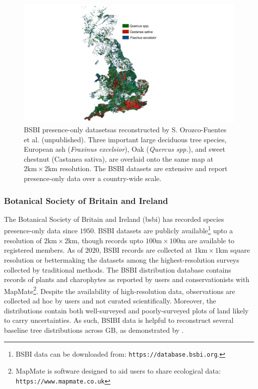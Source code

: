 \begin{figure}
    \centering
    \includegraphics[scale=0.25]{chapter2/figures/bsbi-data.pdf}
    \caption{BSBI presence-only datasets\textemdash as reconstructed by S. Orozco-Fuentes et al. (unpublished).
    Three important large deciduous tree species, European ash (\textit{Fraxinus excelsior}), 
    Oak (\textit{Quercus spp.}), and sweet chestnut (Castanea sativa), are overlaid onto the same map at $\mathrm{2km \times 2km}$ resolution.
    The BSBI datasets are extensive and report presence-only data over a country-wide scale.
    }
    \label{fig:bsbi-data}
\end{figure}

\subsubsection{Botanical Society of Britain and Ireland}

The Botanical Society of Britain and Ireland (\acrshort{bsbi}) has recorded species presence-only data since $1950$.
BSBI datasets are publicly available\footnote{BSBI data can be downloaded from: \nolinkurl{https://database.bsbi.org}.} upto a
resolution of $\mathrm{2 km \times 2km}$, though records upto $\mathrm{100 m \times 100 m}$ are available to registered members.
As of $2020$, BSBI records are collected at $\mathrm{1 km \times 1km}$ square resolution or better\textemdash making the datasets among the 
highest-resolution surveys collected by traditional methods. The BSBI distribution database contains records of plants and charophytes
as reported by users and conservationists with MapMate\footnote{MapMate is software designed to aid users to share ecological data: \nolinkurl{https://www.mapmate.co.uk}}.
Despite the availability of high-resolution data, observations are collected ad hoc by users and not curated scientifically.
Moreover, the distributions contain both well-surveyed and poorly-surveyed plots of land likely to carry uncertainties.
As such, BSIBI data is helpful to reconstruct several baseline tree distributions across GB, as demonstrated by \cite{hill.data}.

